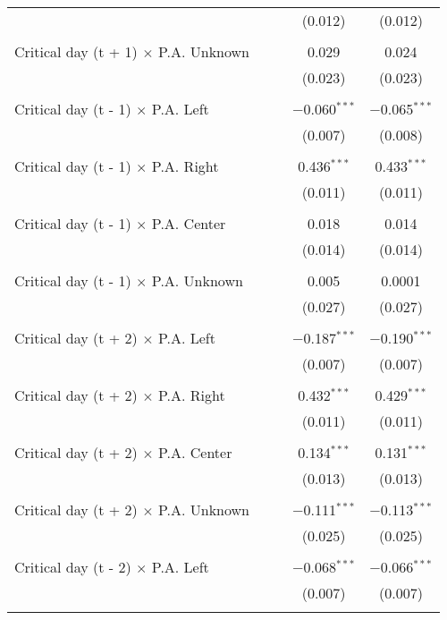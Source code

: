 \documentclass[
]{article}
\begin{document}
\begin{table}[!htbp]
{\begin{tabular}{@{\extracolsep{5pt}}lcccc}
  &  &  & (0.012) & (0.012) \\ 
  & & & & \\ 
 Critical day (t + 1) $\times$ P.A. Unknown &  &  & 0.029 & 0.024 \\ 
  &  &  & (0.023) & (0.023) \\ 
  & & & & \\ 
 Critical day (t - 1) $\times$ P.A. Left &  &  & $-$0.060$^{***}$ & $-$0.065$^{***}$ \\ 
  &  &  & (0.007) & (0.008) \\ 
  & & & & \\ 
 Critical day (t - 1) $\times$ P.A. Right &  &  & 0.436$^{***}$ & 0.433$^{***}$ \\ 
  &  &  & (0.011) & (0.011) \\ 
  & & & & \\ 
 Critical day (t - 1) $\times$ P.A. Center &  &  & 0.018 & 0.014 \\ 
  &  &  & (0.014) & (0.014) \\ 
  & & & & \\ 
 Critical day (t - 1) $\times$ P.A. Unknown &  &  & 0.005 & 0.0001 \\ 
  &  &  & (0.027) & (0.027) \\ 
  & & & & \\ 
 Critical day (t + 2) $\times$ P.A. Left &  &  & $-$0.187$^{***}$ & $-$0.190$^{***}$ \\ 
  &  &  & (0.007) & (0.007) \\ 
  & & & & \\ 
 Critical day (t + 2) $\times$ P.A. Right &  &  & 0.432$^{***}$ & 0.429$^{***}$ \\ 
  &  &  & (0.011) & (0.011) \\ 
  & & & & \\ 
 Critical day (t + 2) $\times$ P.A. Center &  &  & 0.134$^{***}$ & 0.131$^{***}$ \\ 
  &  &  & (0.013) & (0.013) \\ 
  & & & & \\ 
 Critical day (t + 2) $\times$ P.A. Unknown &  &  & $-$0.111$^{***}$ & $-$0.113$^{***}$ \\ 
  &  &  & (0.025) & (0.025) \\ 
  & & & & \\ 
 Critical day (t - 2) $\times$ P.A. Left &  &  & $-$0.068$^{***}$ & $-$0.066$^{***}$ \\ 
  &  &  & (0.007) & (0.007) \\ 
  & & & & \\ 

\end{tabular}}
\end{table}
\end{document}
